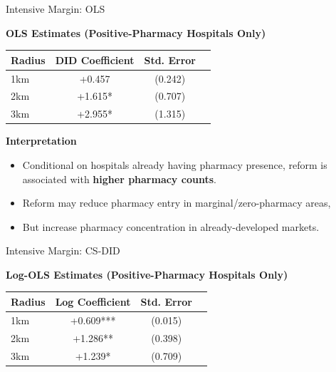 \documentclass{beamer}
\begin{document}

\begin{frame}{Intensive Margin: OLS}


\textbf{OLS Estimates (Positive-Pharmacy Hospitals Only)}

\begin{table}[htbp]
\centering
\small
\begin{tabular}{lccc}
\toprule
\textbf{Radius} & \textbf{DID Coefficient} & \textbf{Std. Error}  \\
\midrule
1km & +0.457 & (0.242)  \\
2km & +1.615* & (0.707)  \\
3km & +2.955* & (1.315)  \\
\bottomrule
\end{tabular}
\end{table}

\vspace{0.3cm}

\textbf{Interpretation}

\begin{itemize}
    \item Conditional on hospitals already having pharmacy presence, reform is associated with \textbf{higher pharmacy counts}.
    \item Reform may reduce pharmacy entry in marginal/zero-pharmacy areas,
    \item But increase pharmacy concentration in already-developed markets.
\end{itemize}  

\end{frame}


\begin{frame}{Intensive Margin: CS-DID}

\textbf{Log-OLS Estimates (Positive-Pharmacy Hospitals Only)}

\begin{table}[htbp]
\centering
\small
\begin{tabular}{lccc}
\toprule
\textbf{Radius} & \textbf{Log Coefficient} & \textbf{Std. Error} \\
\midrule
1km & +0.609*** & (0.015) \\
2km & +1.286** & (0.398) \\
3km & +1.239* & (0.709) \\
\bottomrule
\end{tabular}
\end{table}

\end{frame}
\end{document}
